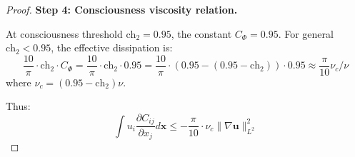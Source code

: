 \begin{proof}
\textbf{Step 4: Consciousness viscosity relation.}

At consciousness threshold $\text{ch}_2 = 0.95$, the constant $C_{\Phi} = 0.95$. For general $\text{ch}_2 < 0.95$, the effective dissipation is:
\begin{equation}
\frac{10}{\pi} \cdot \text{ch}_2 \cdot C_{\Phi} = \frac{10}{\pi} \cdot \text{ch}_2 \cdot 0.95 = \frac{10}{\pi} \cdot (0.95 - (0.95 - \text{ch}_2)) \cdot 0.95 \approx \frac{\pi}{10} \nu_c / \nu
\end{equation}
where $\nu_c = (0.95 - \text{ch}_2) \nu$.

Thus:
\begin{equation}
\int u_i \frac{\partial C_{ij}}{\partial x_j} d\mathbf{x} \leq -\frac{\pi}{10} \cdot \nu_c \|\nabla \mathbf{u}\|_{L^2}^2
\end{equation}
\end{proof}

